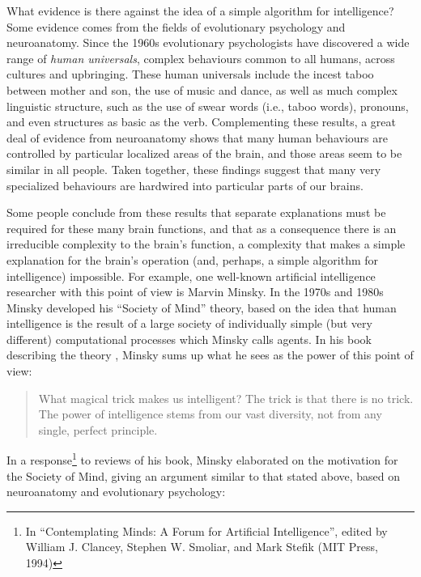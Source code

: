 What evidence is there against the idea of a simple algorithm for intelligence? Some evidence comes from the fields of evolutionary psychology and neuroanatomy. Since the 1960s evolutionary psychologists have discovered a wide range of \textit{human universals}, complex behaviours common to all humans, across cultures and upbringing. These human universals include the incest taboo between mother and son, the use of music and dance, as well as much complex linguistic structure, such as the use of swear words (i.e., taboo words), pronouns, and even structures as basic as the verb. Complementing these results, a great deal of evidence from neuroanatomy shows that many human behaviours are controlled by particular localized areas of the brain, and those areas seem to be similar in all people. Taken together, these findings suggest that many very specialized behaviours are hardwired into particular parts of our brains.

Some people conclude from these results that separate explanations must be required for these many brain functions, and that as a consequence there is an irreducible complexity to the brain's function, a complexity that makes a simple explanation for the brain's operation (and, perhaps, a simple algorithm for intelligence) impossible. For example, one well-known artificial intelligence researcher with this point of view is Marvin Minsky. In the 1970s and 1980s Minsky developed his ``Society of Mind'' theory, based on the idea that human intelligence is the result of a large society of individually simple (but very different) computational processes which Minsky calls agents. In his book describing the theory \cite{wikipediaSocietyofMind2019}, Minsky sums up what he sees as the power of this point of view: 


\begin{quote}
What magical trick makes us intelligent? The trick is that there is no trick. The power of intelligence stems from our vast diversity, not from any single, perfect principle. 
\end{quote}
In a response\footnote{In ``Contemplating Minds: A Forum for Artificial Intelligence'', edited by William J. Clancey, Stephen W. Smoliar, and Mark Stefik (MIT Press, 1994)} to reviews of his book, Minsky elaborated on the motivation for the Society of Mind, giving an argument similar to that stated above, based on neuroanatomy and evolutionary psychology: 

